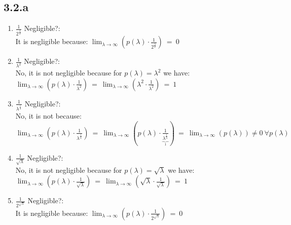 \documentclass{report}
\begin{document}
	\subsection*{3.2.a}
	\begin{enumerate}
		\item $\frac{1}{2^{\frac{\lambda}{2}}}$ Negligible?: \\
		It is negligible because: $\lim_{\lambda \rightarrow \infty} (p(\lambda) \cdot \frac{1}{2^{\frac{\lambda}{2}}}) \ = \ 0$
		\item $\frac{1}{\lambda^2}$ Negligible?: \\
		No, it is not negligible because for $p(\lambda) = \lambda^2$ we have: \\
		$\lim_{\lambda \rightarrow \infty} (p(\lambda) \cdot \frac{1}{\lambda^2})\ = \ \lim_{\lambda \rightarrow \infty} (\lambda^2 \cdot \frac{1}{\lambda^2}) \ = \ 1$
		\item $\frac{1}{\lambda^{\frac{1}{\lambda}}}$ Negligible?: \\
		No, it is not because: $\lim_{\lambda \rightarrow \infty} (p(\lambda) \cdot \frac{1}{\lambda^{\frac{1}{\lambda}}}) \ = \ \lim_{\lambda \rightarrow \infty} (p(\lambda) \cdot \frac{1}{\underbrace{\lambda^{\frac{1}{\lambda}}}_1}) \ = \ \lim_{\lambda \rightarrow \infty} (p(\lambda)) \neq 0 \ \forall p(\lambda)$
		\item $\frac{1}{\sqrt{\lambda}}$ Negligible?: \\
		No, it is not negligible because for $p(\lambda) = \sqrt{\lambda}$ we have: \\
		$\lim_{\lambda \rightarrow \infty} (p(\lambda) \cdot \frac{1}{\sqrt{\lambda}})\ = \ \lim_{\lambda \rightarrow \infty} (\sqrt{\lambda} \cdot \frac{1}{\sqrt{\lambda}}) \ = \ 1$
		\item $\frac{1}{2^{\sqrt{\lambda}}}$ Negligible?: \\
		It is negligible because: $\lim_{\lambda \rightarrow \infty} (p(\lambda) \cdot \frac{1}{2^{\sqrt{\lambda}}}) \ = \ 0$
	\end{enumerate}
\end{document}
